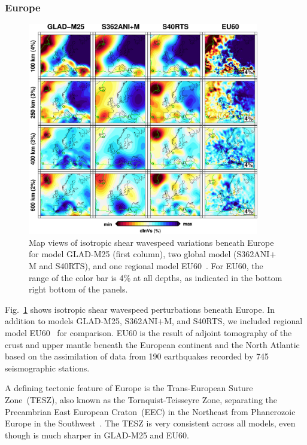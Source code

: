 \subsubsection{Europe}

\begin{figure}[ht!]
\includegraphics[width=0.9\textwidth]{ch-GLADM25/figures/depth_slice/europe_vs.pdf}
  \caption{\small{Map views of isotropic shear wavespeed variations beneath Europe for model GLAD-M25 (first column), two global model (S362ANI$+$M and S40RTS), and
  one regional model EU60~\cite{zhu2015seismic}. For EU60, the range of the color
  bar is 4\% at all depths, as indicated in the bottom right bottom of the panels.}}
\label{fig:europe-vs}
\centering
\end{figure}

Fig.~\ref{fig:europe-vs} shows isotropic shear wavespeed perturbations beneath Europe.
In addition to models GLAD-M25, S362ANI$+$M, and S40RTS, we included regional
model EU60~\cite{zhu2015seismic} for comparison.
EU60 is the result of adjoint tomography of the crust and upper mantle
beneath the European continent and the North Atlantic based on the assimilation of data from
190 earthquakes recorded by 745 seismographic stations.

A defining tectonic feature of Europe is the Trans-European Suture Zone~(TESZ),
also known as the Tornquist-Teisseyre Zone,
separating the Precambrian East European Craton~(EEC) in the Northeast from
Phanerozoic Europe in the Southwest~\cite{zielhuis1994deep}.
The TESZ is very consistent across all models,
even though is much sharper in GLAD-M25 and EU60.

